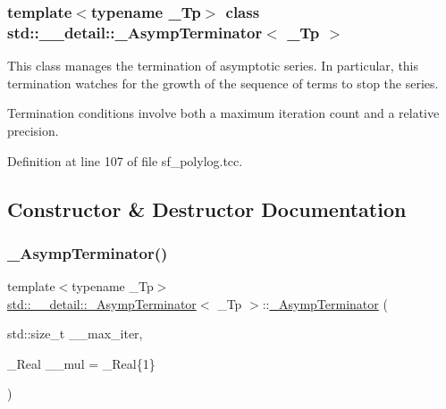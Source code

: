 \subsubsection*{template$<$typename \+\_\+\+Tp$>$\newline
class std\+::\+\_\+\+\_\+detail\+::\+\_\+\+Asymp\+Terminator$<$ \+\_\+\+Tp $>$}

This class manages the termination of asymptotic series. In particular, this termination watches for the growth of the sequence of terms to stop the series.

Termination conditions involve both a maximum iteration count and a relative precision. 

Definition at line 107 of file sf\+\_\+polylog.\+tcc.



\subsection{Constructor \& Destructor Documentation}
\mbox{\label{classstd_1_1____detail_1_1__AsympTerminator_a2a052a2ebedaa33cae3a6c07d73ca9cf}} 
\subsubsection{\texorpdfstring{\+\_\+\+Asymp\+Terminator()}{\_AsympTerminator()}}
{\footnotesize\ttfamily template$<$typename \+\_\+\+Tp$>$ \\
\hyperlink{classstd_1_1____detail_1_1__AsympTerminator}{std\+::\+\_\+\+\_\+detail\+::\+\_\+\+Asymp\+Terminator}$<$ \+\_\+\+Tp $>$\+::\hyperlink{classstd_1_1____detail_1_1__AsympTerminator}{\+\_\+\+Asymp\+Terminator} (\begin{DoxyParamCaption}\item[{std\+::size\+\_\+t}]{\+\_\+\+\_\+max\+\_\+iter,  }\item[{\+\_\+\+Real}]{\+\_\+\+\_\+mul = {\ttfamily \+\_\+Real\{1\}} }\end{DoxyParamCaption})\hspace{0.3cm}{\ttfamily [inline]}}



